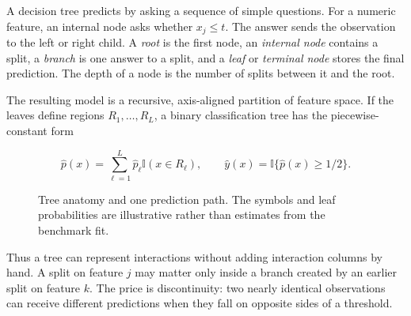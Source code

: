 \documentclass[11pt]{article}
\newcommand{\ind}{\mathbb{1}}
\renewcommand{\ind}{\mathbb{I}}
\begin{document}
A decision tree predicts by asking a sequence of simple questions. For a
numeric feature, an internal node asks whether $x_j\leq t$. The answer sends the
observation to the left or right child. A \emph{root} is the first node, an
\emph{internal node} contains a split, a \emph{branch} is one answer to a split,
and a \emph{leaf} or \emph{terminal node} stores the final prediction. The depth
of a node is the number of splits between it and the root.

The resulting model is a recursive, axis-aligned partition of feature space.
If the leaves define regions $R_1,\ldots,R_L$, a binary classification tree has
the piecewise-constant form

\[
 \hat p(x)=\sum_{\ell=1}^{L}\hat p_{\ell}\ind(x\in R_{\ell}),
 \qquad
 \hat y(x)=\ind\{\hat p(x)\geq 1/2\}.
\]

\begin{figure}[H]
\centering
{}
\caption{Tree anatomy and one prediction path. The symbols and leaf
probabilities are illustrative rather than estimates from the benchmark fit.}
\label{fig:tree-anatomy}
\end{figure}

Thus a tree can represent interactions without adding interaction columns by
hand. A split on feature $j$ may matter only inside a branch created by an
earlier split on feature $k$. The price is discontinuity: two nearly identical
observations can receive different predictions when they fall on opposite sides
of a threshold.
\end{document}

